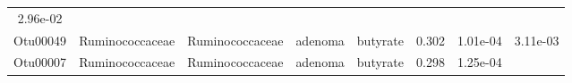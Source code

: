 \documentclass[11pt,]{article}
\begin{document}
\begin{longtable}[]{@{}cccccccc@{}}
\begin{minipage}[t]{0.08\columnwidth}
2.96e-02\strut
\end{minipage}\tabularnewline
\begin{minipage}[t]{0.08\columnwidth}\centering\strut
Otu00049\strut
\end{minipage} & \begin{minipage}[t]{0.15\columnwidth}\centering\strut
Ruminococcaceae\strut
\end{minipage} & \begin{minipage}[t]{0.15\columnwidth}\centering\strut
Ruminococcaceae\strut
\end{minipage} & \begin{minipage}[t]{0.08\columnwidth}\centering\strut
adenoma\strut
\end{minipage} & \begin{minipage}[t]{0.09\columnwidth}\centering\strut
butyrate\strut
\end{minipage} & \begin{minipage}[t]{0.07\columnwidth}\centering\strut
0.302\strut
\end{minipage} & \begin{minipage}[t]{0.08\columnwidth}\centering\strut
1.01e-04\strut
\end{minipage} & \begin{minipage}[t]{0.08\columnwidth}\centering\strut
3.11e-03\strut
\end{minipage}\tabularnewline
\begin{minipage}[t]{0.08\columnwidth}\centering\strut
Otu00007\strut
\end{minipage} & \begin{minipage}[t]{0.15\columnwidth}\centering\strut
Ruminococcaceae\strut
\end{minipage} & \begin{minipage}[t]{0.15\columnwidth}\centering\strut
Ruminococcaceae\strut
\end{minipage} & \begin{minipage}[t]{0.08\columnwidth}\centering\strut
adenoma\strut
\end{minipage} & \begin{minipage}[t]{0.09\columnwidth}\centering\strut
butyrate\strut
\end{minipage} & \begin{minipage}[t]{0.07\columnwidth}\centering\strut
0.298\strut
\end{minipage} & \begin{minipage}[t]{0.08\columnwidth}\centering\strut
1.25e-04\strut
\end{minipage} & \begin{minipage}[t]{0.08\columnwidth}\centering\strut

\end{minipage}
\end{longtable}
\end{document}
